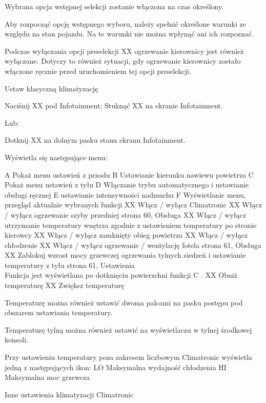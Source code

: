 Wybrana opcja wstępnej selekcji zostanie włączona na czas określony.

Aby rozpocząć opcję wstępnego wyboru, należy spełnić określone warunki ze względu na stan pojazdu. Na te warunki nie można wpłynąć ani ich rozpoznać.

Podczas wyłączania opcji preselekcji XX ogrzewanie kierownicy jest również wyłączane. Dotyczy to również sytuacji, gdy ogrzewanie kierownicy zostało włączone ręcznie przed uruchomieniem tej opcji preselekcji.

Ustaw klasyczną klimatyzację

\begin{itemizeArrow}
	\itemArrow Naciśnij XX pod Infotainment; Stuknąć XX na ekranie Infotainment.
\end{itemizeArrow}
Lub:
\begin{itemizeArrow}
	\itemArrow Dotknij XX na dolnym pasku stanu ekranu Infotainment.
\end{itemizeArrow}

Wyświetla się następujące menu:

A Pokaż menu ustawień z przodu
B Ustawianie kierunku nawiewu powietrza
C Pokaż menu ustawień z tyłu
D Włączanie trybu automatycznego i ustawianie obsługi ręcznej
E ustawianie intensywności nadmuchu
F Wyświetlanie menu, przegląd aktualnie wybranych funkcji
XX Włącz / wyłącz Climatronic
XX Włącz / wyłącz ogrzewanie szyby przedniej \guillemotright strona 60, Obsługa
XX Włącz / wyłącz utrzymanie temperatury wnętrza zgodnie z ustawieniem temperatury po stronie kierowcy
XX Włącz / wyłącz zamknięty obieg powietrza
XX Włącz / wyłącz chłodzenie
XX Włącz / wyłącz ogrzewanie / wentylację fotela \guillemotright strona 61, Obsługa
XX Zablokuj wzrost mocy grzewczej ogrzewania tylnych siedzeń i ustawianie temperatury z tyłu \guillemotright strona 61, Ustawienia \\ Funkcja jest wyświetlana po dotknięciu powierzchni funkcji C .
XX Obniż temperaturę
XX Zwiększ temperaturę

Temperaturę można również ustawić dwoma palcami na pasku postępu pod obszarem ustawiania temperatury.

Temperaturę tylną można również ustawić na wyświetlaczu w tylnej środkowej konsoli.

Przy ustawieniu temperatury poza zakresem liczbowym Climatronic wyświetla jedną z następujących ikon:
LO Maksymalna wydajność chłodzenia
HI Maksymalna moc grzewcza

Inne ustawienia klimatyzacji Climatronic

